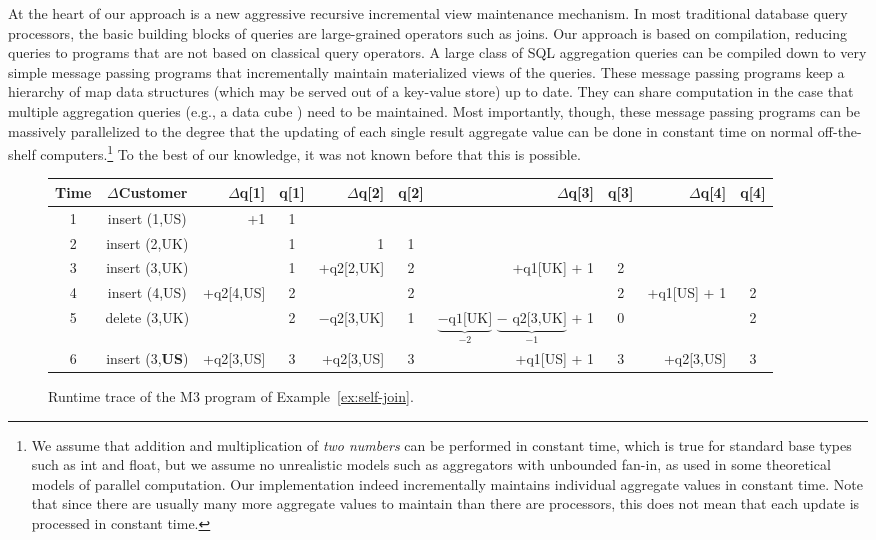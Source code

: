 At the heart of our approach is a new aggressive recursive
incremental view maintenance mechanism.
In most traditional database query processors, the  basic building blocks of
queries are large-grained operators such as joins.
Our approach is based on compilation, reducing
queries to programs that are not based on classical query operators.
A large class of
SQL aggregation queries can be compiled down to very simple message
passing programs that incrementally maintain materialized views of
the queries. These message passing programs keep a hierarchy of map data
structures (which may be served out of a key-value store) up to date.
They can share computation in the case that multiple aggregation queries (e.g.,
a data cube \cite{datacube}) need to be maintained.  Most importantly, though, these message
passing programs can be massively parallelized to the degree that the updating
of each single result aggregate value can be done in constant time on normal
off-the-shelf computers.\footnote{We assume that addition and multiplication
of {\em two numbers} can be performed in constant time, which is true for
%
%
standard base types such as int and float,
but we assume no unrealistic models such
as aggregators with unbounded fan-in, as used in some theoretical models of
parallel computation. Our implementation indeed incrementally maintains
individual aggregate values in constant time. Note that since there are
usually many more aggregate values to maintain than there are processors,
this does not mean that each update is processed in constant time.
}
To the best of our knowledge, it was not known before
that this is possible.


\begin{figure*}[!]
\begin{center}
\begin{tabular}{c|c|rc|rc|rc|rc}
Time & $\Delta$Customer
& $\Delta$q[1] & q[1]
& $\Delta$q[2] & q[2]
& $\Delta$q[3] & q[3]
& $\Delta$q[4] & q[4] \\
\hline
1&insert (1,US) &         +1 & 1 &              &   &              &   &&   \\
2&insert (2,UK) &            & 1 &            1 & 1 &              &   &&   \\
3&insert (3,UK) &            & 1 &   +q2[2,UK] & 2 & +q1[UK] + 1 & 2 &&   \\
4&insert (4,US) & +q2[4,US] & 2 &              & 2 &              & 2 & +q1[US] + 1 & 2 \\
5&delete (3,UK) &            & 2 & $-$q2[3,UK] & 1 & $\underbrace{\mbox{$-$q1[UK]}}_{-2}$ $\underbrace{\mbox{$-$ q2[3,UK]}}_{-1}$ + 1 & 0 && 2 \\
6&insert (3,{\bf US}) & +q2[3,US] & 3 &   +q2[3,US] & 3 & +q1[US] + 1 & 3 & +q2[3,US] & 3  \\
\end{tabular}
\end{center}

\vspace{-4mm}

\caption{Runtime trace of the M3 program of Example~\ref{ex:self-join}.}
\label{fig:trace}
\end{figure*}


